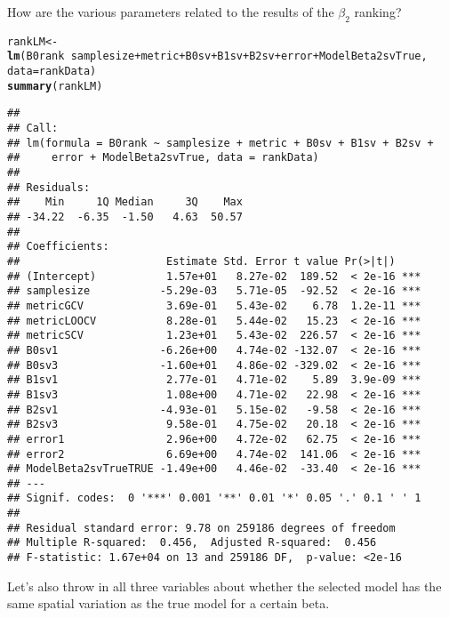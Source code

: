 \documentclass{article}\usepackage[]{graphicx}\usepackage[]{color}
\makeatletter
\newcommand{\hlopt}[1]{\textcolor[rgb]{0,0,0}{#1}}%
\newcommand{\hlstd}[1]{\textcolor[rgb]{0.345,0.345,0.345}{#1}}%
\newcommand{\hlkwb}[1]{\textcolor[rgb]{0.69,0.353,0.396}{#1}}%
\newcommand{\hlkwc}[1]{\textcolor[rgb]{0.333,0.667,0.333}{#1}}%
\newcommand{\hlkwd}[1]{\textcolor[rgb]{0.737,0.353,0.396}{\textbf{#1}}}%
\newenvironment{kframe}{%
 \def\at@end@of@kframe{}%
 \ifinner\ifhmode%
  \def\at@end@of@kframe{\end{minipage}}%
  \begin{minipage}{\columnwidth}%
 \fi\fi%
 \def\FrameCommand##1{\hskip\@totalleftmargin \hskip-\fboxsep
 \colorbox{shadecolor}{##1}\hskip-\fboxsep
     \hskip-\linewidth \hskip-\@totalleftmargin \hskip\columnwidth}%
 \MakeFramed {\advance\hsize-\width
   \@totalleftmargin\z@ \linewidth\hsize
   \@setminipage}}%
 {\par\unskip\endMakeFramed%
 \at@end@of@kframe}
\newenvironment{knitrout}{}{} %
\makeatother
\begin{document}
How are the various parameters related to the results of the $\beta _2$ ranking?
\begin{knitrout}
\color{fgcolor}\begin{kframe}
\begin{alltt}
\hlstd{rankLM} \hlkwb{<-} \hlkwd{lm}\hlstd{(B0rank} \hlopt{~} \hlstd{samplesize} \hlopt{+} \hlstd{metric} \hlopt{+} \hlstd{B0sv} \hlopt{+} \hlstd{B1sv} \hlopt{+} \hlstd{B2sv} \hlopt{+} \hlstd{error} \hlopt{+} \hlstd{ModelBeta2svTrue,}
    \hlkwc{data} \hlstd{= rankData)}
\hlkwd{summary}\hlstd{(rankLM)}
\end{alltt}
\begin{verbatim}
## 
## Call:
## lm(formula = B0rank ~ samplesize + metric + B0sv + B1sv + B2sv + 
##     error + ModelBeta2svTrue, data = rankData)
## 
## Residuals:
##    Min     1Q Median     3Q    Max 
## -34.22  -6.35  -1.50   4.63  50.57 
## 
## Coefficients:
##                       Estimate Std. Error t value Pr(>|t|)    
## (Intercept)           1.57e+01   8.27e-02  189.52  < 2e-16 ***
## samplesize           -5.29e-03   5.71e-05  -92.52  < 2e-16 ***
## metricGCV             3.69e-01   5.43e-02    6.78  1.2e-11 ***
## metricLOOCV           8.28e-01   5.44e-02   15.23  < 2e-16 ***
## metricSCV             1.23e+01   5.43e-02  226.57  < 2e-16 ***
## B0sv1                -6.26e+00   4.74e-02 -132.07  < 2e-16 ***
## B0sv3                -1.60e+01   4.86e-02 -329.02  < 2e-16 ***
## B1sv1                 2.77e-01   4.71e-02    5.89  3.9e-09 ***
## B1sv3                 1.08e+00   4.71e-02   22.98  < 2e-16 ***
## B2sv1                -4.93e-01   5.15e-02   -9.58  < 2e-16 ***
## B2sv3                 9.58e-01   4.75e-02   20.18  < 2e-16 ***
## error1                2.96e+00   4.72e-02   62.75  < 2e-16 ***
## error2                6.69e+00   4.74e-02  141.06  < 2e-16 ***
## ModelBeta2svTrueTRUE -1.49e+00   4.46e-02  -33.40  < 2e-16 ***
## ---
## Signif. codes:  0 '***' 0.001 '**' 0.01 '*' 0.05 '.' 0.1 ' ' 1
## 
## Residual standard error: 9.78 on 259186 degrees of freedom
## Multiple R-squared:  0.456,	Adjusted R-squared:  0.456 
## F-statistic: 1.67e+04 on 13 and 259186 DF,  p-value: <2e-16
\end{verbatim}
\end{kframe}
\end{knitrout}


Let's also throw in all three variables about whether the selected model has the same spatial variation as the true model for a certain beta.
\end{document}
